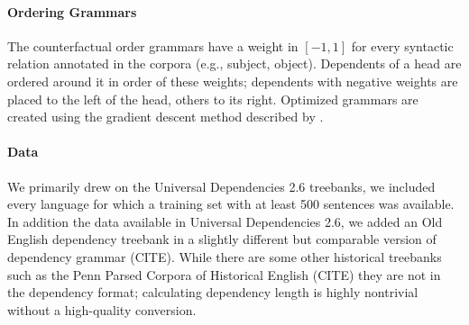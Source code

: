 \documentclass[11pt,a4paper]{article}
\begin{document}



\paragraph{Ordering Grammars}

The counterfactual order grammars have a weight in $[-1, 1]$ for every syntactic relation annotated in the corpora (e.g., subject, object).
Dependents of a head are ordered around it in order of these weights; dependents with negative weights are placed to the left of the head, others to its right.
Optimized grammars are created using the gradient descent method described by \citep{hahn2020universals}.








\paragraph{Data}
We primarily drew on the Universal Dependencies 2.6 treebanks, we included every language for which a training set with at least 500 sentences was available.
In addition the data available in Universal Dependencies 2.6, we added an Old English dependency treebank in a slightly different but comparable version of dependency grammar (CITE).
While there are some other historical treebanks such as the Penn Parsed Corpora of Historical English (CITE) they are not in the dependency format; calculating dependency length is highly nontrivial without a high-quality conversion.
\end{document}

